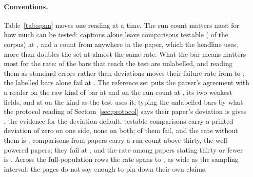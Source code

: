 \documentclass[sigconf,anonymous]{aamas}
\begin{document}
\paragraph{Conventions.} Table~\ref{tab:span} moves one reading at a time.
The run count matters most for how much can be tested: captions alone
leave \nStrictN{} comparisons testable (\nStrictTestable{} of the corpus)
at \nStrictFail{}, and a count from anywhere in the paper, which the
headline uses, more than doubles the set at almost the same rate. What
the bar means matters most for the rate:
\nBarsUnlabelledPct{} of the bars that reach the test are unlabelled, and
reading them as standard errors rather than deviations moves their failure
rate from \nBarsAsStdFail{} to \nBarsAsSemFail{}; the labelled bars alone
fail at \nBarsLabelledFail{}. The reference set puts the parser's
agreement with a reader on the raw kind of bar at \nGDispTypeFrac{} and
on the run count at \nGNRunsFrac{}, its two weakest fields, and at
\nGDispTreatmentFrac{} on the kind as the test uses it; typing the
unlabelled bars by what the protocol reading of Section~\ref{sec:protocol}
says their paper's deviation is gives \nTuFail{}, the evidence for the
deviation default.
\nRZeroN{} testable comparisons carry a printed deviation of zero on one
side, none on both; \nRZeroFail{} of them fail, and the rate without them
is \nRZeroRemovedFail{}. \nRBigNOnlyN{} comparisons from
\nRBigNOnlyPapers{} papers carry a run count above thirty, the
well-powered papers; they fail at \nRBigNOnlyFail{}, and the rate among
papers stating thirty or fewer is \nRBigNRemovedFail{}. Across the
full-population rows the rate spans \nSpanLo{} to \nSpanHi{}, as wide as
the sampling interval: the pages do not say enough to pin down their own
claims.
\end{document}
